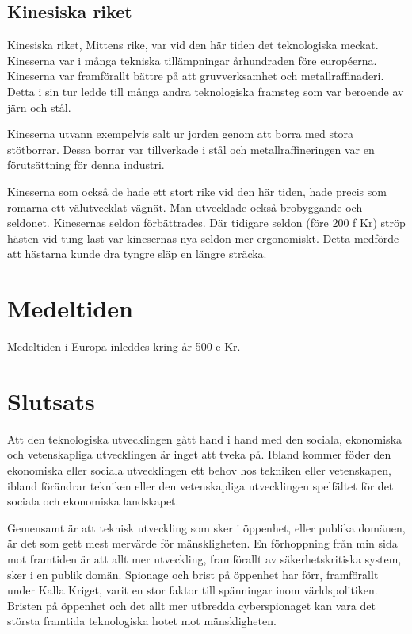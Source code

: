 \documentclass[a4paper,12pt,fleqn]{article}
\begin{document}
\subsection{Kinesiska riket}

Kinesiska riket, Mittens rike, var vid den här tiden det teknologiska meckat. Kineserna var i många tekniska tillämpningar århundraden före européerna. Kineserna var framförallt bättre på att gruvverksamhet och metallraffinaderi. Detta i sin tur ledde till många andra teknologiska framsteg som var beroende av järn och stål. 

Kineserna utvann exempelvis salt ur jorden genom att borra med stora stötborrar. Dessa borrar var tillverkade i stål och metallraffineringen var en förutsättning för denna industri. 

Kineserna som också de hade ett stort rike vid den här tiden, hade precis som romarna ett välutvecklat vägnät. Man utvecklade också brobyggande och seldonet. Kinesernas seldon förbättrades. Där tidigare seldon (före 200 f Kr) ströp hästen vid tung last var kinesernas nya seldon mer ergonomiskt. Detta medförde att hästarna kunde dra tyngre släp en längre sträcka. 


\newpage
\section{Medeltiden}

Medeltiden i Europa inleddes kring år 500 e Kr. 


\newpage

\section{Slutsats}

Att den teknologiska utvecklingen gått hand i hand med den sociala, ekonomiska och vetenskapliga utvecklingen är inget att tveka på. Ibland kommer föder den ekonomiska eller sociala utvecklingen ett behov hos tekniken eller vetenskapen, ibland förändrar tekniken eller den vetenskapliga utvecklingen spelfältet för det sociala och ekonomiska landskapet. 

Gemensamt är att teknisk utveckling som sker i öppenhet, eller publika domänen, är det som gett mest mervärde för mänskligheten. En förhoppning från min sida mot framtiden är att allt mer utveckling, framförallt av säkerhetskritiska system, sker i en publik domän. Spionage och brist på öppenhet har förr, framförallt under Kalla Kriget, varit en stor faktor till spänningar inom världspolitiken. Bristen på öppenhet och det allt mer utbredda cyberspionaget kan vara det största framtida teknologiska hotet mot mänskligheten. 


\newpage
{}

\listoffootnotes
\end{document}
